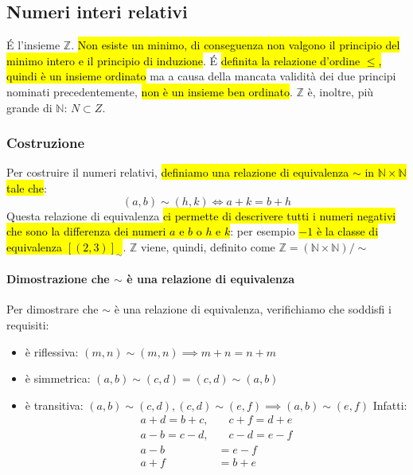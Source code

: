 \subsection{Numeri interi relativi}
\'E l'insieme $\mathbb{Z}$. \hl{Non esiste un minimo, di conseguenza non valgono 
il principio del minimo intero e il principio di induzione}. \'E \hl{definita la
relazione d'ordine $\leq$, quindi è un insieme ordinato} ma a causa della
mancata validità dei due principi nominati precedentemente, \hl{non è un insieme
ben ordinato}. $\mathbb{Z}$ è, inoltre, più grande di $\mathbb{N}$: $ N \subset Z$.

\subsubsection{Costruzione} 
Per costruire il numeri relativi, \hl{definiamo una relazione di equivalenza 
$\sim$ in $\mathbb{N} \times \mathbb{N}$ tale che}:
\[ (a,b) \sim (h,k) \iff a+k=b+h \]
Questa relazione di equivalenza \hl{ci permette di descrivere tutti i numeri negativi
che sono la differenza dei numeri $a$ e $b$ o $h$ e $k$}: per esempio \hl{$-1$ è la 
classe di equivalenza $[(2,3)]_{\sim}$}. $\mathbb{Z}$ viene, quindi, definito come
$\mathbb{Z} = (\mathbb{N} \times \mathbb{N}) / \sim$

\paragraph{Dimostrazione che $\sim$ è una relazione di equivalenza} Per
dimostrare che $\sim$ è una relazione di equivalenza, verifichiamo che soddisfi
i requisiti:
\begin{itemize}
    \item è riflessiva: $(m,n) \sim (m,n) \implies m+n = n+m$
    \item è simmetrica: $(a,b) \sim (c,d) = (c,d) \sim (a,b)$
    \item è transitiva: $(a,b) \sim (c,d), (c,d) \sim (e,f) \implies (a,b)\sim(e,f)$
        Infatti: 
        \begin{align*}
            a+d=b+c, &\quad c+f=d+e \\
            a-b=c-d, &\quad c-d=e-f \\
            a-b&=e-f \\
            a+f&=b+e
        \end{align*}
\end{itemize}

